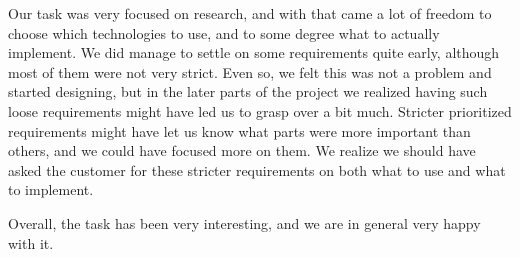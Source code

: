Our task was very focused on research, and with that came a lot of freedom to choose which technologies to use, and to some degree what to actually implement. We did manage to settle on some requirements quite early, although most of them were not very strict. Even so, we felt this was not a problem and started designing, but in the later parts of the project we realized having such loose requirements might have led us to grasp over a bit much. Stricter prioritized requirements might have let us know what parts were more important than others, and we could have focused more on them. We realize we should have asked the customer for these stricter requirements on both what to use and what to implement.

Overall, the task has been very interesting, and we are in general very happy with it.